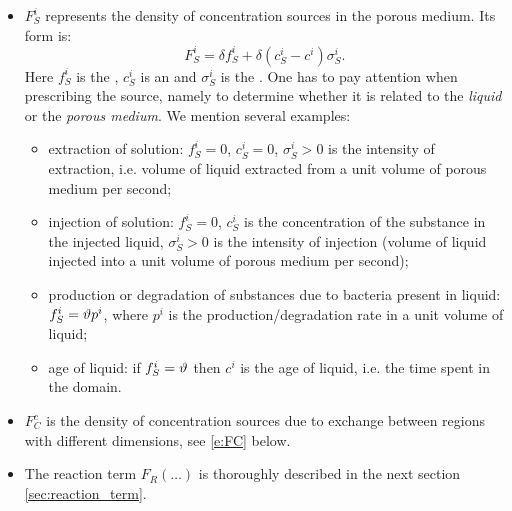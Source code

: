\begin{itemize}
\item $F_S^i$  represents the density of concentration sources in the porous medium.
Its form is:
\begin{equation}
 F_S^i = \delta f^i_S + \delta(c_S^i-c^i)\sigma_S^i. \label{eqn:transport_sources}
\end{equation}
Here $f_S^i$  is the , $c_S^i$  is an  and $\sigma_S^i$  is the .
One has to pay attention when prescribing the source, namely to determine whether it is related to the \emph{liquid} or the \emph{porous medium}. We mention several examples:
\begin{itemize}
\item extraction of solution: $f_S^i = 0$, $c_S^i = 0$, $\sigma_S^i>0$ is the intensity of extraction, i.e. volume of liquid extracted from a unit volume of porous medium per second;
\item injection of solution: $f_S^i = 0$, $c_S^i$ is the concentration of the substance in the injected liquid, $\sigma_S^i>0$ is the intensity of injection (volume of liquid injected into a unit volume of porous medium per second);
\item production or degradation of substances due to bacteria present in liquid: $f_S^i=\vartheta p^i$, where $p^i$ is the production/degradation rate in a unit volume of liquid;
\item age of liquid: if $f_S^i=\vartheta$ then $c^i$ is the age of liquid, i.e. the time spent in the domain.
\end{itemize}

\item $F^c_C$  is the density of concentration sources due to exchange between regions with different dimensions, see \eqref{e:FC} below.

\item The reaction term $F_R(\dots)$  is thoroughly described in the next section \ref{sec:reaction_term}.
\end{itemize}



